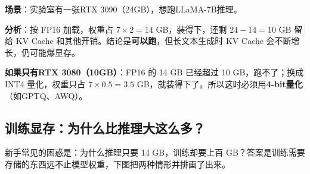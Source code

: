 \begin{example}
\textbf{场景}：实验室有一张RTX 3090（24GB），想跑LLaMA-7B推理。

\textbf{分析}：按 FP16 加载，权重占 $7 \times 2 = 14$ GB，装得下，还剩 $24 - 14 = 10$ GB 留给 KV Cache 和其他开销。结论是\textbf{可以跑}，但长文本生成时 KV Cache 会不断增长，仍可能爆显存。

\textbf{如果只有RTX 3080（10GB）}：FP16 的 14 GB 已经超过 10 GB，跑不了；换成 INT4 量化，权重只占 $7 \times 0.5 = 3.5$ GB，就装得下了。所以这时必须用\textbf{4-bit量化}（如GPTQ、AWQ）。
\end{example}

\subsection*{训练显存：为什么比推理大这么多？}

新手常见的困惑是：为什么推理只要 14 GB，训练却要上百 GB？答案是训练需要存储的东西远不止模型权重，下图把两种情形并排画了出来。


